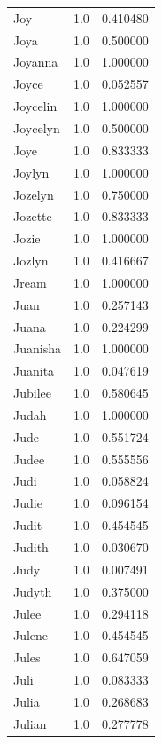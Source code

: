 \documentclass[
  letterpaper,
  DIV=11,
  numbers=noendperiod]{scrreprt}
\begin{document}
\begin{tabular}{lrr}
Joy             &   1.0 &   0.410480 \\
Joya            &   1.0 &   0.500000 \\
Joyanna         &   1.0 &   1.000000 \\
Joyce           &   1.0 &   0.052557 \\
Joycelin        &   1.0 &   1.000000 \\
Joycelyn        &   1.0 &   0.500000 \\
Joye            &   1.0 &   0.833333 \\
Joylyn          &   1.0 &   1.000000 \\
Jozelyn         &   1.0 &   0.750000 \\
Jozette         &   1.0 &   0.833333 \\
Jozie           &   1.0 &   1.000000 \\
Jozlyn          &   1.0 &   0.416667 \\
Jream           &   1.0 &   1.000000 \\
Juan            &   1.0 &   0.257143 \\
Juana           &   1.0 &   0.224299 \\
Juanisha        &   1.0 &   1.000000 \\
Juanita         &   1.0 &   0.047619 \\
Jubilee         &   1.0 &   0.580645 \\
Judah           &   1.0 &   1.000000 \\
Jude            &   1.0 &   0.551724 \\
Judee           &   1.0 &   0.555556 \\
Judi            &   1.0 &   0.058824 \\
Judie           &   1.0 &   0.096154 \\
Judit           &   1.0 &   0.454545 \\
Judith          &   1.0 &   0.030670 \\
Judy            &   1.0 &   0.007491 \\
Judyth          &   1.0 &   0.375000 \\
Julee           &   1.0 &   0.294118 \\
Julene          &   1.0 &   0.454545 \\
Jules           &   1.0 &   0.647059 \\
Juli            &   1.0 &   0.083333 \\
Julia           &   1.0 &   0.268683 \\
Julian          &   1.0 &   0.277778 \\

\end{tabular}
\end{document}
